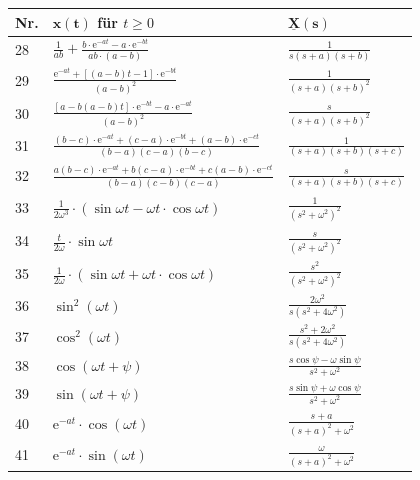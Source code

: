 \begin{table}[h!]
\begin{minipage}[t]{0.5\columnwidth}
\begin{tabularx}{\columnwidth}{|l|l|X|}
		\hline
	\end{tabularx}
\end{minipage}
\begin{minipage}{0.5\columnwidth}
\begin{tabularx}{\columnwidth}{|l|l|X|}
			\hline
	Nr. & $\mathbf{x(t)}$ für $t \geq 0$ & $\mathbf{\underline{X}(s)}$ \\
			\hline 28 & 
	$\frac{1}{a b}+\frac{b \cdot \mathrm{e}^{-a t}-a \cdot \mathrm{e}^{-b t}}{a b \cdot(a-b)}$
	& 
	$\frac{1}{s(s+a)(s+b)}$
	\\	
		\hline 29 & 
		$\frac{\mathrm{e}^{-a t}+[(a-b) t-1] \cdot \mathrm{e}^{-b t}}{(a-b)^2}$
		& 
		$\frac{1}{(s+a)(s+b)^2}$
		\\
		\hline 30 & 
		$\frac{[a-b(a-b) t] \cdot \mathrm{e}^{-b t}-a \cdot \mathrm{e}^{-a t}}{(a-b)^2}$
		& 
		$\frac{s}{(s+a)(s+b)^2}$
		\\
		\hline 31 & 
		$\frac{(b-c) \cdot \mathrm{e}^{-a t}+(c-a) \cdot \mathrm{e}^{-b t}+(a-b) \cdot \mathrm{e}^{-c t}}{(b-a)(c-a)(b-c)}$ & 
		$\frac{1}{(s+a)(s+b)(s+c)}$ \\
		\hline 32 & 
		$\frac{a(b-c) \cdot \mathrm{e}^{-a t}+b(c-a) \cdot \mathrm{e}^{-b t}+c(a-b) \cdot \mathrm{e}^{-c t}}{(b-a)(c-b)(c-a)}$ & $\frac{s}{(s+a)(s+b)(s+c)}$ \\
		\hline 33 & $\frac{1}{2 \omega^3} \cdot(\sin \omega t-\omega t \cdot \cos \omega t)$ & $\frac{1}{\left(s^2+\omega^2\right)^2}$ \\
		\hline 34 & $\frac{t}{2 \omega} \cdot \sin \omega t$ & $\frac{s}{\left(s^2+\omega^2\right)^2}$ \\
		\hline 35 & $\frac{1}{2 \omega} \cdot(\sin \omega t+\omega t \cdot \cos \omega t)$ & $\frac{s^2}{\left(s^2+\omega^2\right)^2}$ \\
		\hline 36 & $\sin ^2(\omega t)$ & 
		$\frac{2 \omega^2}{s\left(s^2+4 \omega^2\right)}$ \\
		\hline 37 & $\cos ^2(\omega t)$ & 
		$\frac{s^2+2 \omega^2}{s\left(s^2+4 \omega^2\right)}$ \\
		\hline 38 & $\cos (\omega t+\psi)$ & 
		$\frac{s \cos \psi-\omega \sin \psi}{s^2+\omega^2}$ \\
		\hline 39 & $\sin (\omega t+\psi)$ & $\frac{s \sin \psi+\omega \cos \psi}{s^2+\omega^2}$ \\
		\hline 40 & $\mathrm{e}^{-a t} \cdot \cos (\omega t)$ & 
		$\frac{s+a}{(s+a)^2+\omega^2}$ \\
		\hline 41 & $\mathrm{e}^{-a t} \cdot \sin (\omega t)$ & 
		$\frac{\omega}{(s+a)^2+\omega^2}$ \\

\end{tabularx}
\end{minipage}
\end{table}
